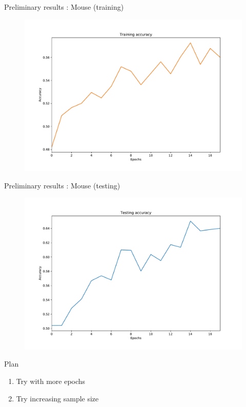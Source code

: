 \documentclass[11pt]{beamer}
\begin{document}
\begin{frame}{Preliminary results : Mouse (training)}
\begin{figure}
\includegraphics[width=\textwidth,height=\textheight,keepaspectratio]{training_accuracy_mouse}
\end{figure}
\end{frame}

\begin{frame}{Preliminary results : Mouse (testing)}
\begin{figure}
\includegraphics[width=\textwidth,height=\textheight,keepaspectratio]{testing_accuracy_mouse}
\end{figure}
\end{frame}



\begin{frame}{Plan}
\begin{enumerate}
\item Try with more epochs
\item Try increasing sample size
\end{enumerate}
\end{frame}
\end{document}
